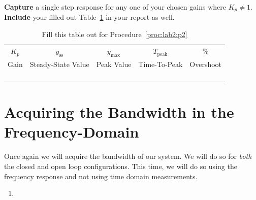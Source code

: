 %
\begin{deliverable}[label={lab2:d2}]
  \textbf{Capture} a single step response for any one of your chosen
  gains where \(K_p \neq 1.\) \textbf{Include} your filled out
  Table~\ref{tab:lab2:p2} in your report as well.
\end{deliverable}
%
\begin{table}
  \centering
  \begin{tabular}{c|c|c|c|c}
    \(K_p\)
      & \(y_\mathrm{ss}\)
      & \(y_\mathrm{max}\)
      & \(T_\mathrm{peak}\)
      & \(\%\) \\
    Gain
      & Steady-State Value
      & Peak Value
      & Time-To-Peak
      & Overshoot \\ \hline
    & & & & \\ \hline
    & & & & \\ \hline
    & & & & \\ \hline
    & & & &
  \end{tabular}
  \caption[Lab 2: Recording Characteristics]{
    Fill this table out for Procedure~\ref{proc:lab2:p2}
  }
  \label{tab:lab2:p2}
\end{table}
%

\section{Acquiring the Bandwidth in the Frequency-Domain}
Once again we will acquire the bandwidth of our system. We will do so for
\emph{both} the closed and open loop configurations. This time, we will do
so using the frequency response and not using time domain measurements.
%
\begin{procedure}[label={proc:lab2:p3}]
  \begin{enumerate}[label=(\arabic*)]
    \item{}
  \end{enumerate}
\end{procedure}
